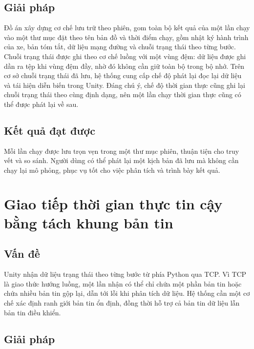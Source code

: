 ﻿\documentclass[../DoAn.tex]{subfiles}
\begin{document}
\subsection{Giải pháp}

Đồ án xây dựng cơ chế lưu trữ theo phiên, gom toàn bộ kết quả của một lần chạy vào
một thư mục đặt theo tên bản đồ và thời điểm chạy, gồm nhật ký hành trình của xe,
bản tóm tắt, dữ liệu mạng đường và chuỗi trạng thái theo từng bước. Chuỗi trạng
thái được ghi theo cơ chế luồng với một vùng đệm: dữ liệu được ghi dần ra tệp khi
vùng đệm đầy, nhờ đó không cần giữ toàn bộ trong bộ nhớ. Trên cơ sở chuỗi trạng
thái đã lưu, hệ thống cung cấp chế độ phát lại đọc lại dữ liệu và tái hiện diễn
biến trong Unity. Đáng chú ý, chế độ thời gian thực cũng ghi lại chuỗi trạng thái
theo cùng định dạng, nên một lần chạy thời gian thực cũng có thể được phát lại về
sau.

\subsection{Kết quả đạt được}

Mỗi lần chạy được lưu trọn vẹn trong một thư mục phiên, thuận tiện cho truy vết và
so sánh. Người dùng có thể phát lại một kịch bản đã lưu mà không cần chạy lại mô
phỏng, phục vụ tốt cho việc phân tích và trình bày kết quả.

\section{Giao tiếp thời gian thực tin cậy bằng tách khung bản tin}
\label{sec:tcp-framing}

\subsection{Vấn đề}

Unity nhận dữ liệu trạng thái theo từng bước từ phía Python qua TCP. Vì TCP là
giao thức hướng luồng, một lần nhận có thể chỉ chứa một phần bản tin hoặc chứa
nhiều bản tin gộp lại, dẫn tới lỗi khi phân tích dữ liệu. Hệ thống cần một cơ chế
xác định ranh giới bản tin ổn định, đồng thời hỗ trợ cả bản tin dữ liệu lẫn bản
tin điều khiển.

\subsection{Giải pháp}
\end{document}

